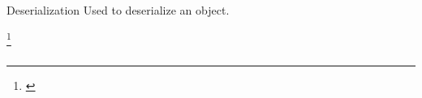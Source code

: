 \begin{pattern}{Deserialization}
Used to deserialize an object.

\instances

\footnote{\url{}}

\begin{verbatim}

\end{verbatim}

\detection{}

\discussion{}

\related{}

\end{pattern}